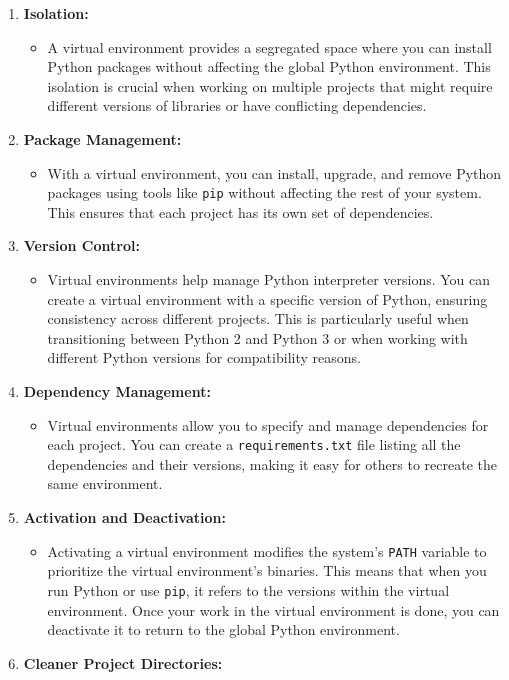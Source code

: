 \documentclass[
  letterpaper,
  DIV=11,
  numbers=noendperiod]{scrreprt}
\providecommand{\tightlist}{%
  \setlength{\itemsep}{0pt}\setlength{\parskip}{0pt}}\usepackage{longtable,booktabs,array}
\begin{document}
\begin{enumerate}
\def\labelenumi{\arabic{enumi}.}
\tightlist
\item
  \textbf{Isolation:}

  \begin{itemize}
  \tightlist
  \item
    A virtual environment provides a segregated space where you can
    install Python packages without affecting the global Python
    environment. This isolation is crucial when working on multiple
    projects that might require different versions of libraries or have
    conflicting dependencies.
  \end{itemize}
\item
  \textbf{Package Management:}

  \begin{itemize}
  \tightlist
  \item
    With a virtual environment, you can install, upgrade, and remove
    Python packages using tools like \texttt{pip} without affecting the
    rest of your system. This ensures that each project has its own set
    of dependencies.
  \end{itemize}
\item
  \textbf{Version Control:}

  \begin{itemize}
  \tightlist
  \item
    Virtual environments help manage Python interpreter versions. You
    can create a virtual environment with a specific version of Python,
    ensuring consistency across different projects. This is particularly
    useful when transitioning between Python 2 and Python 3 or when
    working with different Python versions for compatibility reasons.
  \end{itemize}
\item
  \textbf{Dependency Management:}

  \begin{itemize}
  \tightlist
  \item
    Virtual environments allow you to specify and manage dependencies
    for each project. You can create a \texttt{requirements.txt} file
    listing all the dependencies and their versions, making it easy for
    others to recreate the same environment.
  \end{itemize}
\item
  \textbf{Activation and Deactivation:}

  \begin{itemize}
  \tightlist
  \item
    Activating a virtual environment modifies the system's \texttt{PATH}
    variable to prioritize the virtual environment's binaries. This
    means that when you run Python or use \texttt{pip}, it refers to the
    versions within the virtual environment. Once your work in the
    virtual environment is done, you can deactivate it to return to the
    global Python environment.
  \end{itemize}
\item
  \textbf{Cleaner Project Directories:}


\end{enumerate}
\end{document}
